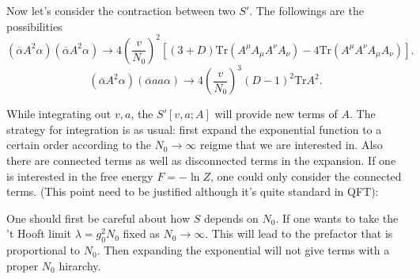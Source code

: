 Now let's consider the contraction between two $S'$.
The followings are the possibilities
\[
	(\overline{\alpha}A^2\alpha) (\overline{\alpha}A^2\alpha)
	\to
	4 \left( \frac{v}{N_0} \right)^2 \left[ (3+D) \mathrm{Tr}(A^\mu A_\mu A^\nu A_\nu) - 4 \mathrm{Tr}(A^\mu A^\nu A_\mu A_\nu) \right] 
.\] 
\[
	(\overline{\alpha} A^2 \alpha) (\overline{\alpha} a a \alpha)
	\to
	4\left( \frac{v}{N_0} \right)^3 (D-1)^2 \mathrm{Tr}A^2 
.\] 

While integrating out $v,a$, the $S'[v,a;A]$ will provide new terms of $A$.
The strategy for integration is as usual:
first expand the exponential function to a certain order
according to the $N_0\to\infty$ reigme that we are interested in.
Also there are connected terms as well as disconnected terms in the expansion.
If one is interested in the free energy $F=-\ln Z$,
one could only consider the connected terms.
(This point need to be justified although it's quite standard in QFT):

One should first be careful about how $S$ depends on $N_0$.
If one wants to take the 't Hooft limit $\lambda = g_0^2 N_0$ fixed as $N_0\to\infty$.
This will lead to the prefactor that is proportional to $N_0$.
Then expanding the exponential will not give terms with a proper $N_0$ hirarchy.

